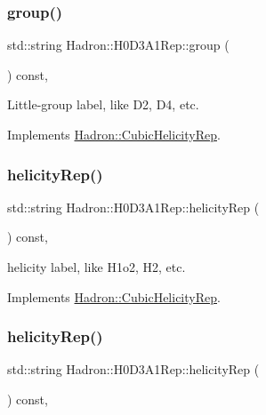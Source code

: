 \subsubsection{\texorpdfstring{group()}{group()}\hspace{0.1cm}{\footnotesize\ttfamily [5/5]}}
{\footnotesize\ttfamily std\+::string Hadron\+::\+H0\+D3\+A1\+Rep\+::group (\begin{DoxyParamCaption}{ }\end{DoxyParamCaption}) const\hspace{0.3cm}{\ttfamily [inline]}, {\ttfamily [virtual]}}

Little-\/group label, like D2, D4, etc. 

Implements \mbox{\hyperlink{structHadron_1_1CubicHelicityRep_a101a7d76cd8ccdad0f272db44b766113}{Hadron\+::\+Cubic\+Helicity\+Rep}}.

\mbox{\label{structHadron_1_1H0D3A1Rep_a6a15df8ab6ee2e04b693258ef6cd02ef}} 
\subsubsection{\texorpdfstring{helicityRep()}{helicityRep()}\hspace{0.1cm}{\footnotesize\ttfamily [1/3]}}
{\footnotesize\ttfamily std\+::string Hadron\+::\+H0\+D3\+A1\+Rep\+::helicity\+Rep (\begin{DoxyParamCaption}{ }\end{DoxyParamCaption}) const\hspace{0.3cm}{\ttfamily [inline]}, {\ttfamily [virtual]}}

helicity label, like H1o2, H2, etc. 

Implements \mbox{\hyperlink{structHadron_1_1CubicHelicityRep_af1096946b7470edf0a55451cc662f231}{Hadron\+::\+Cubic\+Helicity\+Rep}}.

\mbox{\label{structHadron_1_1H0D3A1Rep_a6a15df8ab6ee2e04b693258ef6cd02ef}} 
\subsubsection{\texorpdfstring{helicityRep()}{helicityRep()}\hspace{0.1cm}{\footnotesize\ttfamily [2/3]}}
{\footnotesize\ttfamily std\+::string Hadron\+::\+H0\+D3\+A1\+Rep\+::helicity\+Rep (\begin{DoxyParamCaption}{ }\end{DoxyParamCaption}) const\hspace{0.3cm}{\ttfamily [inline]}, {\ttfamily [virtual]}}

